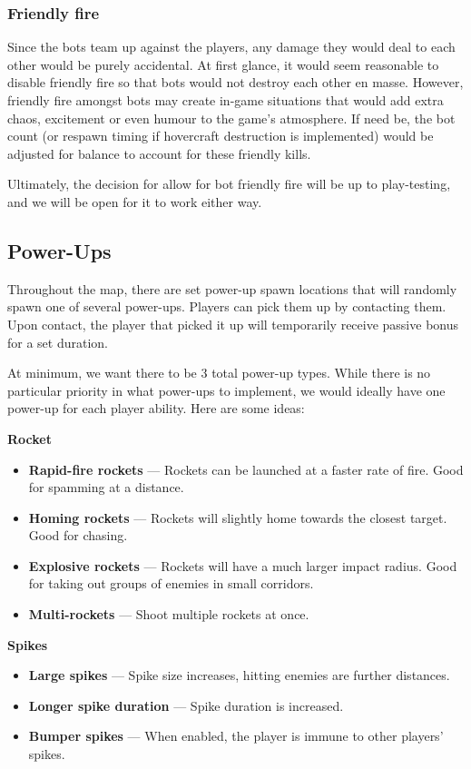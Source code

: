 \documentclass{article}
\theoremstyle{definition}
\begin{document}
\subsubsection{Friendly fire}

Since the bots team up against the players, any damage they would deal to each
other would be purely accidental. At first glance, it would seem reasonable to
disable friendly fire so that bots would not destroy each other en masse.
However, friendly fire amongst bots may create in-game situations that would
add extra chaos, excitement or even humour to the game's atmosphere. If need
be, the bot count (or respawn timing if hovercraft destruction is implemented)
would be adjusted for balance to account for these friendly kills.

Ultimately, the decision for allow for bot friendly fire will be up to
play-testing, and we will be open for it to work either way.

\subsection{Power-Ups}

Throughout the map, there are set power-up spawn locations that will randomly
spawn one of several power-ups. Players can pick them up by contacting them.
Upon contact, the player that picked it up will temporarily receive passive
bonus for a set duration.

At minimum, we want there to be 3 total power-up types. While there is no
particular priority in what power-ups to implement, we would ideally have one
power-up for each player ability. Here are some ideas:

\textbf{Rocket}
\begin{itemize}
  \item \textbf{Rapid-fire rockets} --- Rockets can be launched at a faster rate of
    fire. Good for spamming at a distance.
  \item \textbf{Homing rockets} --- Rockets will slightly home towards the
    closest target. Good for chasing.
  \item \textbf{Explosive rockets} --- Rockets will have a much larger impact
    radius. Good for taking out groups of enemies in small corridors.
  \item \textbf{Multi-rockets} --- Shoot multiple rockets at once.
\end{itemize}

\textbf{Spikes}
\begin{itemize}
  \item \textbf{Large spikes} --- Spike size increases, hitting enemies are
    further distances.
  \item \textbf{Longer spike duration} --- Spike duration is increased.
  \item \textbf{Bumper spikes} --- When enabled, the player is immune to other
    players' spikes.
\end{itemize}
\end{document}
